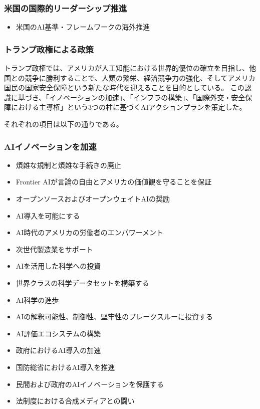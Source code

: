 \subsubsection*{米国の国際的リーダーシップ推進}

\begin{itemize}
    \item 米国のAI基準・フレームワークの海外推進
\end{itemize}


\subsubsection{トランプ政権による政策}

トランプ政権では、アメリカが人工知能における世界的優位の確立を目指し、他国との競争に勝利することで、人類の繁栄、経済競争力の強化、そしてアメリカ国民の国家安全保障という新たな時代を迎えることを目的としている。
この認識に基づき、「イノベーションの加速」、「インフラの構築」、「国際外交・安全保障における主導権」という3つの柱に基づくAIアクションプランを策定した。

それぞれの項目は以下の通りである。

\subsubsection*{AIイノベーションを加速}

\begin{itemize}
    \item 煩雑な規制と煩雑な手続きの廃止
    \item Frontier AIが言論の自由とアメリカの価値観を守ることを保証
    \item オープンソースおよびオープンウェイトAIの奨励
    \item AI導入を可能にする
    \item AI時代のアメリカの労働者のエンパワーメント
    \item 次世代製造業をサポート
    \item AIを活用した科学への投資
    \item 世界クラスの科学データセットを構築する
    \item AI科学の進歩
    \item AIの解釈可能性、制御性、堅牢性のブレークスルーに投資する
    \item AI評価エコシステムの構築
    \item 政府におけるAI導入の加速
    \item 国防総省におけるAI導入を推進
    \item 民間および政府のAIイノベーションを保護する
    \item 法制度における合成メディアとの闘い
\end{itemize}

